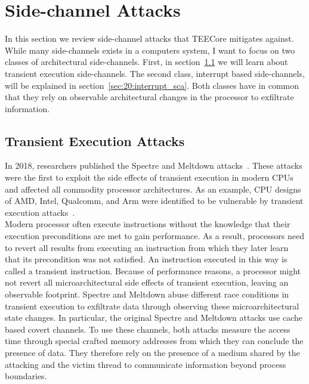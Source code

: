 \section{Side-channel Attacks}
\label{sec:20:attacks}
In this section we review side-channel attacks that TEECore mitigates
against. While many side-channels exists in a computers system, I want to focus
on two classes of architectural side-channels. First, in
section~\ref{sec:20:transientattacks} we will learn about transient execution
side-channels. The second class, interrupt based side-channels, will be
explained in section~\ref{sec:20:interrupt_sca}. Both classes have in common
that they rely on observable architectural changes in the processor to
exfiltrate information.

\subsection{Transient Execution Attacks}
\label{sec:20:transientattacks}
In 2018, researchers published the Spectre and Meltdown
attacks~\cite{Kocher2018spectre, lipp_meltdown_2020}. These attacks were the
first to exploit the side effects of transient execution in modern CPUs and
affected all commodity processor architectures. As an example, CPU designs of
AMD, Intel, Qualcomm, and Arm were identified to be vulnerable by transient
execution
attacks~\cite{wikner2022retbleed,moghimi2023downfall,ragab_ghostrace_2024}.\\

Modern processor often execute instructions without the knowledge that their
execution preconditions are met to gain performance. As a result, processors
need to revert all results from executing an instruction from which they later
learn that its precondition was not satisfied. An instruction executed in this
way is called a transient instruction. Because of performance reasons, a
processor might not revert all microarchitectural side effects of transient
execution, leaving an observable footprint. Spectre and Meltdown abuse
different race conditions in transient execution to exfiltrate data through
observing these microarchitectural state changes. In particular, the original
Spectre and Meltdown attacks use cache based covert channels. To use these
channels, both attacks measure the access time through special crafted memory
addresses from which they can conclude the presence of data. They therefore rely
on the presence of a medium shared by the attacking and the victim thread to
communicate information beyond process boundaries. \\

